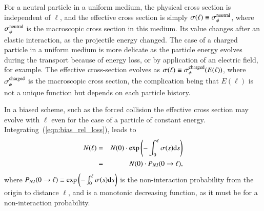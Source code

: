 For a neutral particle in a uniform medium, the physical cross section is 
independent of $\ell$, and the effective cross section is simply
$\sigma(\ell) \equiv \sigma^{\rm neutral}_\phi$, 
where $\sigma^{\rm neutral}_\phi$ is the macroscopic cross section in this medium.
Its value changes after an elastic interaction, as the projectile energy changed.
The case of a charged particle in a uniform medium is more delicate
as the particle energy evolves during the transport because of energy loss,
or by application of an electric field, for example.
The effective cross-section evolves as
$\sigma(\ell) \equiv \sigma^{\rm charged}_\phi(E(\ell))$,
where $\sigma^{\rm charged}_\phi$ is the macroscopic cross section, the
complication being that $E(\ell)$ is not a unique function but depends on
each particle history.

In a biased scheme, such as the forced collision the effective cross section may
evolve with $\ell$ even for the case of a particle of constant energy.\\

Integrating~(\ref{eqn:bias_rel_loss}), leads to
\begin{eqnarray}
N(\ell) &=& N(0)\cdot \exp\left(-\int_0^\ell {\sigma(s){\rm d}s}\right) \nonumber \\
        &=& N(0)\cdot P_{NI}(0\to\ell),
\end{eqnarray}
where $P_{NI}(0\to\ell) \equiv \exp\left(-\int_0^\ell {\sigma(s){\rm d}s}\right)$
is the non-interaction probability from the origin to distance $\ell$,
and is a monotonic decreasing function, as it must be for a non-interaction probability.
%


